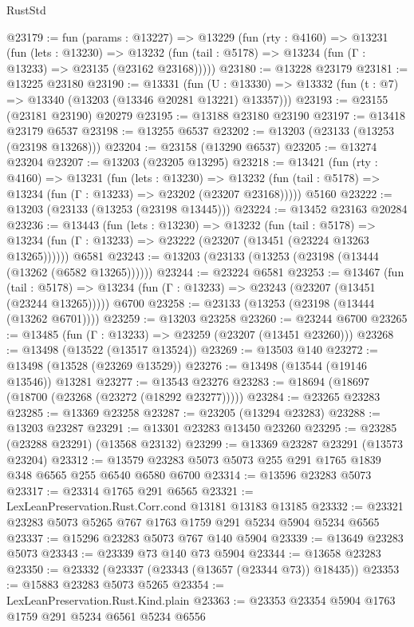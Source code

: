 \begin{lexlean}{RustStd}
\begin{coremodule}
@23179 := fun (params : @13227) =>
  @13229
    (fun (rty : @4160) =>
    @13231
      (fun (lets : @13230) =>
      @13232 (fun (tail : @5178) => @13234 (fun (Γ : @13233) => @23135 (@23162 @23168)))))
@23180 := @13228 @23179
@23181 := @13225 @23180
@23190 := @13331
    (fun (U : @13330) => @13332 (fun (t : @7) => @13340 (@13203 (@13346 @20281 @13221) @13357)))
@23193 := @23155 (@23181 @23190) @20279
@23195 := @13188 @23180 @23190
@23197 := @13418 @23179 @6537
@23198 := @13255 @6537
@23202 := @13203 (@23133 (@13253 (@23198 @13268)))
@23204 := @23158 (@13290 @6537)
@23205 := @13274 @23204
@23207 := @13203 (@23205 @13295)
@23218 := @13421
    (fun (rty : @4160) =>
    @13231
      (fun (lets : @13230) =>
      @13232 (fun (tail : @5178) => @13234 (fun (Γ : @13233) => @23202 (@23207 @23168)))))
    @5160
@23222 := @13203 (@23133 (@13253 (@23198 @13445)))
@23224 := @13452 @23163 @20284
@23236 := @13443
    (fun (lets : @13230) =>
    @13232
      (fun (tail : @5178) =>
      @13234 (fun (Γ : @13233) => @23222 (@23207 (@13451 (@23224 @13263 @13265))))))
    @6581
@23243 := @13203 (@23133 (@13253 (@23198 (@13444 (@13262 (@6582 @13265))))))
@23244 := @23224 @6581
@23253 := @13467
    (fun (tail : @5178) => @13234 (fun (Γ : @13233) => @23243 (@23207 (@13451 (@23244 @13265)))))
    @6700
@23258 := @23133 (@13253 (@23198 (@13444 (@13262 @6701))))
@23259 := @13203 @23258
@23260 := @23244 @6700
@23265 := @13485 (fun (Γ : @13233) => @23259 (@23207 (@13451 @23260)))
@23268 := @13498 (@13522 (@13517 @13524))
@23269 := @13503 @140
@23272 := @13498 (@13528 (@23269 @13529))
@23276 := @13498 (@13544 (@19146 @13546)) @13281
@23277 := @13543 @23276
@23283 := @18694 (@18697 (@18700 (@23268 (@23272 (@18292 @23277)))))
@23284 := @23265 @23283
@23285 := @13369 @23258
@23287 := @23205 (@13294 @23283)
@23288 := @13203 @23287
@23291 := @13301 @23283 @13450 @23260
@23295 := @23285 (@23288 @23291) (@13568 @23132)
@23299 := @13369 @23287 @23291 (@13573 @23204)
@23312 := @13579 @23283 @5073 @5073 @255 @291 @1765 @1839 @348 @6565 @255 @6540 @6580 @6700
@23314 := @13596 @23283 @5073
@23317 := @23314 @1765 @291 @6565
@23321 := LexLeanPreservation.Rust.Corr.cond @13181 @13183 @13185
@23332 := @23321 @23283 @5073 @5265 @767 @1763 @1759 @291 @5234 @5904 @5234 @6565
@23337 := @15296 @23283 @5073 @767 @140 @5904
@23339 := @13649 @23283 @5073
@23343 := @23339 @73 @140 @73 @5904
@23344 := @13658 @23283
@23350 := @23332 (@23337 (@23343 (@13657 (@23344 @73)) @18435))
@23353 := @15883 @23283 @5073 @5265
@23354 := LexLeanPreservation.Rust.Kind.plain
@23363 := @23353 @23354 @5904 @1763 @1759 @291 @5234 @6561 @5234 @6556

\end{coremodule}
\end{lexlean}
